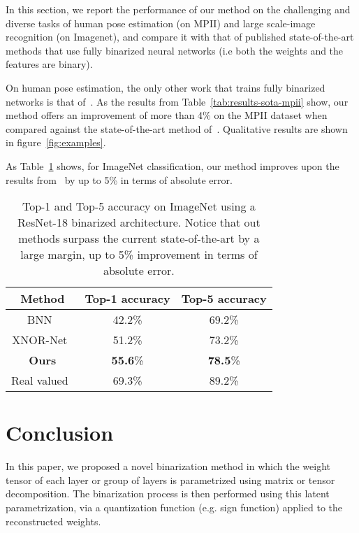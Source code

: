 \documentclass[10pt,twocolumn,letterpaper]{article}
\begin{document}
In this section, we report the performance of our method on the challenging and diverse tasks of human pose estimation (on MPII) and large scale-image recognition (on Imagenet), and compare it with that of published  state-of-the-art methods that use fully binarized neural networks (i.e both the weights and the features are binary). 

On human pose estimation, the only other work that trains fully binarized networks is that of~\cite{bulat2017binarized}. As the results from Table~\ref{tab:results-sota-mpii} show, our method offers an improvement of more than 4\% on the MPII dataset when compared against the state-of-the-art method of~\cite{bulat2017binarized}. Qualitative results are shown in figure~\ref{fig:examples}.


As Table~\ref{tab:results-sota-imagenet} shows, for ImageNet classification, our method improves upon the results from~\cite{rastegari2016xnor} by up to 5\% in terms of absolute error.

\begin{table}[!htbp]
\small{
	\begin{center}
		\begin{tabular}{|c|c|c|}
			\hline
			Method & Top-1 accuracy & Top-5 accuracy \\
			\hline\hline
			BNN~\cite{courbariaux2016binarized} & 42.2\% & 69.2\% \\
			XNOR-Net~\cite{rastegari2016xnor} & 51.2\% & 73.2\% \\
			\hline
			\textbf{Ours} & \textbf{55.6}\%  & \textbf{78.5}\% \\
			\hline
			Real valued~\cite{he2016deep} & 69.3\% & 89.2\% \\
            \hline
		\end{tabular}
	\end{center}
	}
	\caption{Top-1 and Top-5 accuracy on ImageNet using a ResNet-18 binarized architecture. Notice that out methods surpass the current state-of-the-art by a large margin, up to 5\% improvement in terms of absolute error.}
	\label{tab:results-sota-imagenet}
\end{table} 
\section{Conclusion}\label{sec:conclusion}

In this paper, we proposed a novel binarization method in which the weight tensor of each layer or group of layers is parametrized using matrix or tensor decomposition. The binarization process is then performed using this latent parametrization, via a quantization function (e.g. sign function) applied to the reconstructed weights. 
\end{document}
